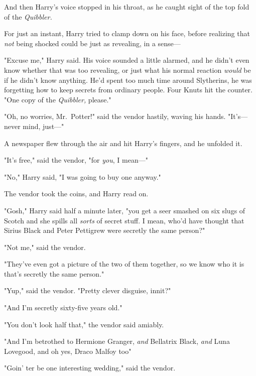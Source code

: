 And then Harry's voice stopped in his throat, as he caught sight of the top
fold of the \emph{Quibbler.}


For just an instant, Harry tried to clamp down on his face, before realizing
that \emph{not} being shocked could be just as revealing, in a sense---

"Excuse me," Harry said. His voice sounded a little alarmed, and he didn't even
know whether that was too revealing, or just what his normal reaction
\emph{would} be if he didn't know anything. He'd spent too much time around
Slytherins, he was forgetting how to keep secrets from ordinary people. Four
Knuts hit the counter. "One copy of the \emph{Quibbler,} please."

"Oh, no worries, Mr.~Potter!" said the vendor hastily, waving his hands.
"It's---never mind, just\mbox{---}"

A newspaper flew through the air and hit Harry's fingers, and he unfolded it.


"It's free," said the vendor, "for \emph{you}, I mean\mbox{---}"

"No," Harry said, "I was going to buy one anyway."

The vendor took the coins, and Harry read on.

"Gosh," Harry said half a minute later, "you get a seer smashed on six slugs of
Scotch and she spills all \emph{sorts} of secret stuff. I mean, who'd have
thought that Sirius Black and Peter Pettigrew were secretly the same person?"

"Not me," said the vendor.

"They've even got a picture of the two of them together, so we know who it is
that's secretly the same person."

"Yup," said the vendor. "Pretty clever disguise, innit?"

"And I'm secretly sixty-five years old."

"You don't look half that," the vendor said amiably.

"And I'm betrothed to Hermione Granger, \emph{and} Bellatrix Black, \emph{and}
Luna Lovegood, and oh yes, Draco Malfoy too{\el}"

"Goin' ter be one interesting wedding," said the vendor.

